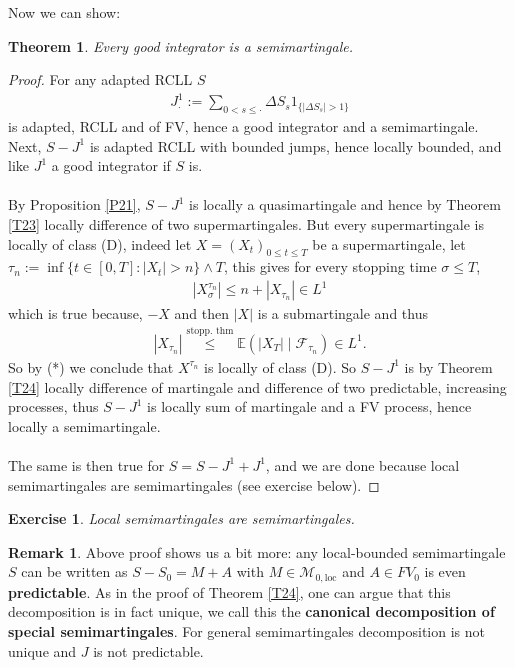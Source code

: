\documentclass[12pt,a4paper, twoside]{article}
\newtheorem{thm}{Theorem}[section]
\newtheorem{exe}{Exercise}[section]
\theoremstyle{definition}
\newtheorem{rem}{Remark}[section]
\newcommand{\EE}{\mathbb{E}} %
\begin{document}
\newpage
Now we can show:
\begin{thm}\label{T25} Every good integrator is a semimartingale.
\end{thm}
\begin{proof}
For any adapted RCLL $S$ 
\begin{align*}
J_\cdot^1 := \sum_{0 < s \leq \cdot } \Delta S_s 1_{\{ | \Delta S_s| > 1 \}}
\end{align*}
is adapted, RCLL and of FV, hence a good integrator and a semimartingale. Next, $S-J^1$ is adapted RCLL with bounded jumps, hence locally bounded, and like $J^1$ a good integrator if $S$ is. \\
\\
By Proposition \ref{P21}, $S-J^1$ is locally a quasimartingale and hence by Theorem \ref{T23} locally difference of two supermartingales. But every supermartingale is locally of class (D), indeed let $X=(X_t)_{0 \leq t \leq T}$ be a supermartingale, let $\tau_n := \inf \{ t \in [0,T]: |X_t| > n \} \wedge T$, this gives for every stopping time $\sigma \leq T$, 
\begin{align*}
|X_\sigma^{\tau_n}| \leq n + |X_{\tau_n}| \in L^1 \tag{*}
\end{align*}
which is true because, $-X$ and then $|X|$ is a submartingale and thus 
\begin{align*}
|X_{\tau_n}| \overset{\text{stopp. thm}}\leq \EE( |X_T| \mid \mathcal{F}_{\tau_n}) \in  L^1.
\end{align*}
So by (*) we conclude that $X^{\tau_n}$ is locally of class (D). So $S-J^1$ is by Theorem \ref{T24} locally difference of martingale and difference of two predictable,  increasing processes, thus $S-J^1$ is locally sum of martingale and a FV process, hence locally a semimartingale. 
\\\\
The same is then true for $S=S-J^1 + J^1$, and we are done because local semimartingales are semimartingales (see exercise below).
\end{proof}
\begin{exe}Local semimartingales are semimartingales.
\end{exe}
\begin{rem}Above proof shows us a bit more: any local-bounded semimartingale $S$ can be written as $S-S_0 = M +A$ with $M \in \mathcal{M}_{0, \text{loc}}$ and $A \in FV_0$ is even \textbf{predictable}. As in the proof of Theorem \ref{T24}, one can argue that this decomposition is in fact unique, we call this the \textbf{canonical decomposition of special semimartingales}. For general semimartingales decomposition is not unique and $J$ is not predictable. 
\end{rem}
\end{document}
